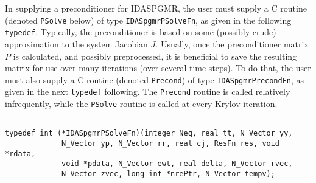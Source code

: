 \documentclass[11pt]{article}
\begin{document}
In supplying a preconditioner for IDASPGMR, the user must supply a C
routine (denoted {\tt PSolve} below) of type {\tt IDASpgmrPSolveFn},
as given in the following {\tt typedef}.  Typically, the
preconditioner is based on some (possibly crude) approximation to the
system Jacobian $J$.  Usually, once the preconditioner matrix $P$ is
calculated, and possibly preprocessed, it is beneficial to save the
resulting matrix for use over many iterations (over several time
steps).  To do that, the user must also supply a C routine (denoted
{\tt Precond}) of type {\tt IDASpgmrPrecondFn}, as given in the next
{\tt typedef} following.  The {\tt Precond} routine is called
relatively infrequently, while the {\tt PSolve} routine is called
at every Krylov iteration.

\small
\begin{verbatim}

typedef int (*IDASpgmrPSolveFn)(integer Neq, real tt, N_Vector yy,
             N_Vector yp, N_Vector rr, real cj, ResFn res, void *rdata,
             void *pdata, N_Vector ewt, real delta, N_Vector rvec,
             N_Vector zvec, long int *nrePtr, N_Vector tempv);


\end{verbatim}
\end{document}
